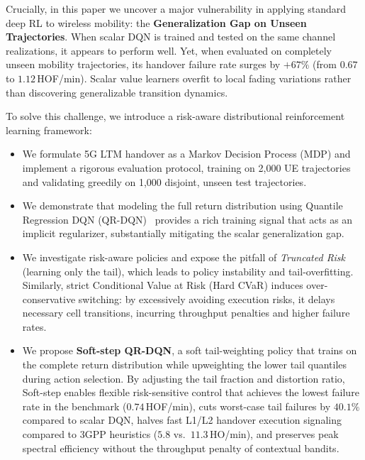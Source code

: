 \documentclass{ieeetmlcn}
\begin{document}
Crucially, in this paper we uncover a major vulnerability in applying standard deep RL to wireless mobility: the \textbf{Generalization Gap on Unseen Trajectories}. When scalar DQN is trained and tested on the same channel realizations, it appears to perform well. Yet, when evaluated on completely unseen mobility trajectories, its handover failure rate surges by $+67\%$ (from $0.67$ to $1.12$\,HOF/min). Scalar value learners overfit to local fading variations rather than discovering generalizable transition dynamics.

To solve this challenge, we introduce a risk-aware distributional reinforcement learning framework:
\begin{itemize}\setlength\itemsep{0.5pt}\setlength\parskip{0pt}
  \item We formulate 5G LTM handover as a Markov Decision Process (MDP) and implement a rigorous evaluation protocol, training on 2,000 UE trajectories and validating greedily on 1,000 disjoint, unseen test trajectories.
  \item We demonstrate that modeling the full return distribution using Quantile Regression DQN (QR-DQN)~\cite{qrdqn} provides a rich training signal that acts as an implicit regularizer, substantially mitigating the scalar generalization gap.
  \item We investigate risk-aware policies and expose the pitfall of \emph{Truncated Risk} (learning only the tail), which leads to policy instability and tail-overfitting. Similarly, strict Conditional Value at Risk (Hard CVaR) induces over-conservative switching: by excessively avoiding execution risks, it delays necessary cell transitions, incurring throughput penalties and higher failure rates.
  \item We propose \textbf{Soft-step QR-DQN}, a soft tail-weighting policy that trains on the complete return distribution while upweighting the lower tail quantiles during action selection. By adjusting the tail fraction and distortion ratio, Soft-step enables flexible risk-sensitive control that achieves the lowest failure rate in the benchmark ($0.74$\,HOF/min), cuts worst-case tail failures by $40.1\%$ compared to scalar DQN, halves fast L1/L2 handover execution signaling compared to 3GPP heuristics ($5.8$ vs.\ $11.3$\,HO/min), and preserves peak spectral efficiency without the throughput penalty of contextual bandits.
\end{itemize}
\end{document}
